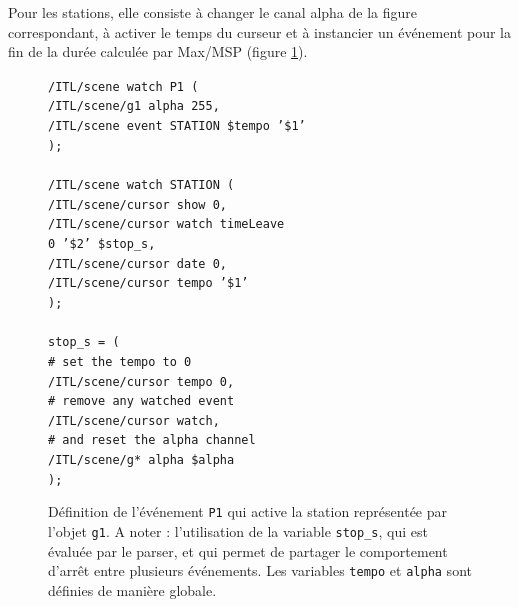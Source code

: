 \documentclass{article}
\newcommand{\OSC}[1]	{{\fontsize{9pt}{9pt} \selectfont\texttt{#1}}}
\newcommand{\tab}{\hspace*{4mm}}
\newcommand{\sample}[1]		{\vspace{-0.2em}\begin{center}\colorbox{mygrey}{\begin{minipage}[t]{0.98\columnwidth} {\small \texttt{#1}}\end{minipage}}\end{center}}
\begin{document}
Pour les stations, elle consiste à changer le canal alpha de la figure correspondant, à activer le temps du curseur et à instancier un événement pour la fin de la durée calculée par Max/MSP (figure \ref{fig:station}). 
\begin{figure}[h]
   \centering
\sample{/ITL/scene watch P1 ( \\
\tab/ITL/scene/g1 alpha 255, \\
\tab/ITL/scene event STATION \$tempo '\$1' \\
); \\
\\
/ITL/scene watch STATION ( \\
\tab/ITL/scene/cursor show 0,\\
\tab/ITL/scene/cursor watch timeLeave \\
\hspace*{30mm}0 '\$2' \$stop\_s,\\
\tab/ITL/scene/cursor date 0,\\
\tab/ITL/scene/cursor tempo '\$1'\\
); \\
\\
stop\_s = ( \\
\tab\# set the tempo to 0 \\
\tab/ITL/scene/cursor tempo 0, \\
\tab\# remove any watched event \\
\tab/ITL/scene/cursor watch,  \\
\tab\# and reset the alpha channel \\
\tab/ITL/scene/g* alpha \$alpha \\
);
}
   \caption{Définition de l'événement \OSC{P1} qui active la station représentée par l'objet \OSC{g1}. A noter : l'utilisation de la variable \OSC{stop\_s}, qui est évaluée par le parser, et qui permet de partager le comportement d'arrêt entre plusieurs événements. Les variables \OSC{tempo} et \OSC{alpha} sont définies de manière globale.}
   \label{fig:station}
\end{figure}
\end{document}
